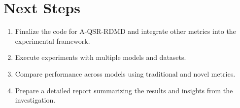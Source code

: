 \documentclass{article}
\begin{document}
\section{Next Steps}
\begin{enumerate}
    \item Finalize the code for A-QSR-RDMD and integrate other metrics into the experimental framework.
    \item Execute experiments with multiple models and datasets.
    \item Compare performance across models using traditional and novel metrics.
    \item Prepare a detailed report summarizing the results and insights from the investigation.
\end{enumerate}
\end{document}
